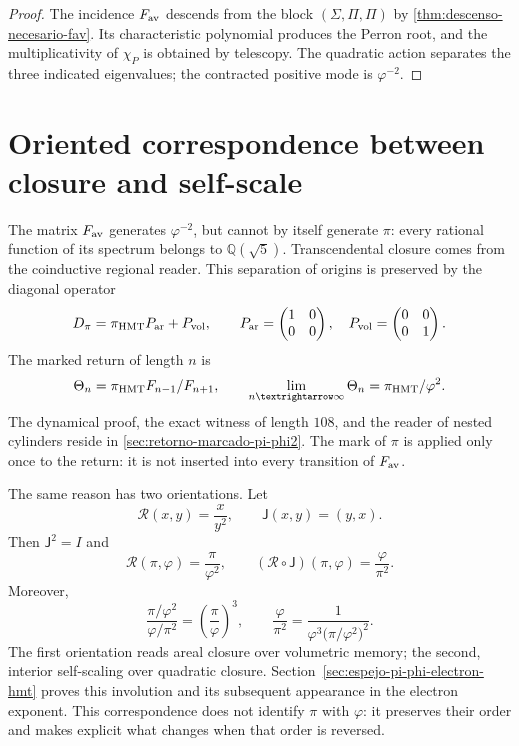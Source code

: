 \begin{proof}
The incidence \(F_{\rm av}\) descends from the block
\((\Sigma,\Pi,\Pi)\) by
\cref{thm:descenso-necesario-fav}. Its characteristic polynomial produces the
Perron root, and the multiplicativity of \(\chi_P\) is obtained by
telescopy. The quadratic action separates the three indicated eigenvalues; the
contracted positive mode is \(\varphi^{-2}\).
\end{proof}

\section{Oriented correspondence between closure and self-scale}

The matrix \(F_{\rm av}\) generates \(\varphi^{-2}\), but cannot by itself
generate \(\pi\): every rational function of its spectrum belongs to
\(\mathbb Q(\sqrt5)\). Transcendental closure comes from the coinductive regional
reader. This separation of origins is preserved by the diagonal operator
\[
 D_\pi=\pi_{\rm HMT}P_{\rm ar}+P_{\rm vol},
\qquad
 P_{\rm ar}=
 \begin{pmatrix}1&0\\0&0\end{pmatrix},
\quad
 P_{\rm vol}=
 \begin{pmatrix}0&0\\0&1\end{pmatrix}.
\]
The marked return of length \(n\) is
\[
\Theta_n
=\pi_{\rm HMT}\frac{F_{n-1}}{F_{n+1}},
\qquad
\lim_{n\to\infty}\Theta_n
=\frac{\pi_{\rm HMT}}{\varphi^2}.
\]
The dynamical proof, the exact witness of length \(108\), and the reader
of nested cylinders reside in
\cref{sec:retorno-marcado-pi-phi2}. The mark of \(\pi\) is applied only once
to the return: it is not inserted into every transition of \(F_{\rm av}\).

The same reason has two orientations. Let
\[
\mathscr R(x,y)=\frac{x}{y^2},
\qquad
\mathsf J(x,y)=(y,x).
\]
Then \(\mathsf J^2=I\) and
\[
\boxed{
\mathscr R(\pi,\varphi)=\frac{\pi}{\varphi^2},
\qquad
(\mathscr R\circ\mathsf J)(\pi,\varphi)
=\frac{\varphi}{\pi^2}.}
\]
Moreover,
\[
\frac{\pi/\varphi^2}{\varphi/\pi^2}
={\left(\frac{\pi}{\varphi}\right)}^3,
\qquad
\frac{\varphi}{\pi^2}
=\frac{1}{\varphi^3{\bigl(\pi/\varphi^2\bigr)}^2}.
\]
The first orientation reads areal closure over volumetric memory; the second, interior self-scaling over quadratic closure. Section~\ref{sec:espejo-pi-phi-electron-hmt} proves this involution and its subsequent appearance in the electron exponent. This correspondence does not identify \(\pi\) with \(\varphi\): it preserves their order and makes explicit what changes when that order is reversed.

